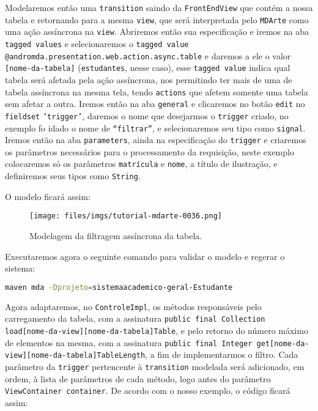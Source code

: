 Modelaremos então uma \texttt{transition} saindo da \texttt{FrontEndView} que
contém a nossa tabela e retornando para a mesma \texttt{view}, que será
interpretada pelo \texttt{MDArte} como uma ação assíncrona na \texttt{view}.
Abriremos então sua especificação e iremos na aba \texttt{tagged values} e
selecionaremos o \texttt{tagged value}
\texttt{@andromda.presentation.web.action.async.table} e daremos a ele o valor
\texttt{[nome-da-tabela]} (\texttt{estudantes}, nesse caso), esse \texttt{tagged
value} indica qual tabela será afetada pela ação assíncrona, nos permitindo ter
mais de uma de tabela assíncrona na mesma tela, tendo \texttt{actions} que
afetem somente uma tabela sem afetar a outra. Iremos então na aba
\texttt{general} e clicaremos no botão \texttt{edit} no \texttt{fieldset}
\texttt{'trigger'}, daremos o nome que desejarmos o \texttt{trigger} criado, no
exemplo fo idado o nome de \texttt{“filtrar”}, e selecionaremos seu tipo como
\texttt{signal}. Iremos então na aba \texttt{parameters}, ainda na especificação
do \texttt{trigger} e criaremos os parâmetros necessários para o processamento
da requisição, neste exemplo colocaremos só os parâmetros \texttt{matrícula} e
\texttt{nome}, a título de ilustração, e definiremos seus tipos como
\texttt{String}.

O modelo ficará assim:
\begin{figure}[H]
	\centering
	\texttt{[image: files/imgs/tutorial-mdarte-0036.png]}
	\caption{Modelagem da filtragem assíncrona da tabela.}
	\label{modelando_filtragem_assincrona}
\end{figure}

Executaremos agora o seguinte comando para validar o modelo e regerar o
sistema:
\begin{lstlisting}[language=bash, frame=single, breaklines=true]
maven mda -Dprojeto=sistemaacademico-geral-Estudante
\end{lstlisting}

Agora adaptaremos, no \texttt{ControleImpl}, os métodos responsáveis pelo
carregamento da tabela, com a assinatura \texttt{public final Collection
load[nome-da-view][nome-da-tabela]Table}, e pelo retorno do número máximo de
elementos na mesma, com a assinatura \texttt{public final Integer
get[nome-da-view][nome-da-tabela]TableLength}, a fim de implementarmos o filtro.
Cada parâmetro da \texttt{trigger} pertencente à \texttt{transition} modelada
será adicionado, em ordem, à lista de parâmetros de cada método, logo antes do
parâmetro \texttt{ViewContainer container}. De acordo com o nosso exemplo, o
código ficará assim:


